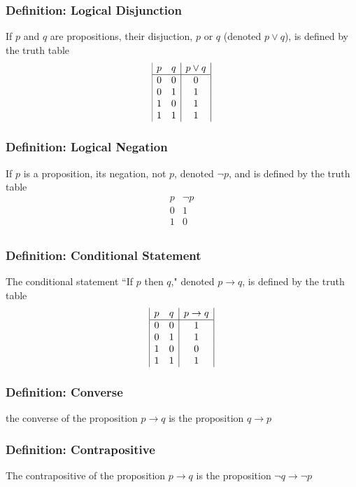 \documentclass{article}
\begin{document}
\subsubsection*{Definition: Logical Disjunction}
If $p$ and $q$ are propositions, their disjuction, $p$ or $q$ (denoted $p \lor q$), is defined by the truth table
$$\begin{array}{|c c|c|}
p & q & p \lor q \\
\hline
0 & 0 & 0\\
0 & 1 & 1\\
1 & 0 & 1\\
1 & 1 & 1\\
\end{array}$$

\subsubsection*{Definition: Logical Negation}
If $p$ is a proposition, its negation, not $p$, denoted $\neg p$, and is defined by the truth table
$$\begin{array}{c|c}
    p & \neg p \\
    \hline
    0 & 1\\
    1 & 0 \\
\end{array}$$


\subsubsection*{Definition: Conditional Statement}
The conditional statement ``If $p$ then $q$," denoted $p \to q$, is defined by the truth table
$$\begin{array}{|c c|c|}
p & q & p \to q \\
\hline
0 & 0 & 1\\
0 & 1 & 1\\
1 & 0 & 0\\
1 & 1 & 1\\
\end{array}$$

\subsubsection*{Definition: Converse}
the converse of the proposition $p \to q$ is the proposition $q \to p$

\subsubsection*{Definition: Contrapositive}
The contrapositive of the proposition $p \to q$ is the proposition $\neg q \to \neg p$
\end{document}
